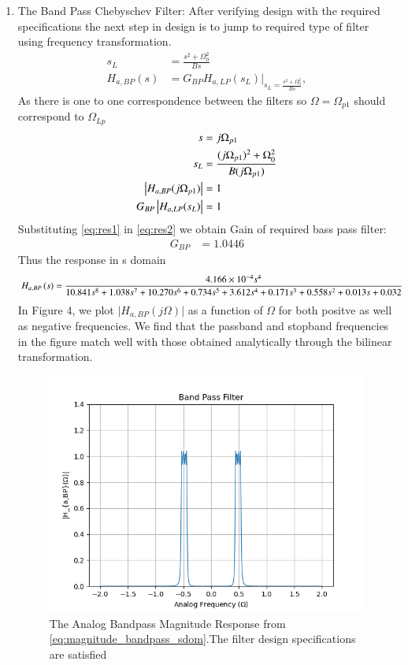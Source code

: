 \documentclass{article}
\begin{document}
\begin{enumerate}
\item {The Band Pass Chebyschev Filter:} 
After verifying design with the required specifications the next step in design is to jump to required type of filter using frequency transformation. 
\begin{align}
    s_L &= \frac{s^2 + \Omega_0^2}{Bs} \\
    H_{a,BP}(s) &= G_{BP}H_{a,LP}(s_L)\vert_{s_L = \frac{s^2 + \Omega_0^2}{Bs}},
\end{align}
As there is one to one correspondence between the filters so $\Omega=\Omega_{p1}$ should correspond to $\Omega_{Lp}$
\begin{align}
    s &= j\Omega_{p1}\\
    s_{L} &= \frac{(j\Omega_{p1})^2 + \Omega_0^2}{B(j\Omega_{p1})} \label{eq:res1} \\ 
    \left\vert H_{a,BP}(j\Omega_{p1})\right\vert &= 1 \\
    G_{BP}\left\vert H_{a,LP}(s_L)\right\vert &= 1 \label{eq:res2}
\end{align}
Substituting \eqref{eq:res1} in \eqref{eq:res2} we obtain Gain of required bass pass filter:
\begin{align}
    G_{BP} &= 1.0446 
\end{align}
Thus the response in s domain 
\begin{align}
    H_{a,BP}\left(s\right) &= \frac{4.166\times 10^{-4}s^4}{10.841s^8 + 1.038s^7 + 10.270s^6 + 0.734s^5 + 3.612s^4 + 0.171s^3 + 0.558s^2 + 0.013s + 0.032} \label{eq:magnitude_bandpass_sdom}
\end{align}
In Figure 4, we plot $\vert H_{a,BP}(j\Omega)\vert$ as a function of $\Omega$ for both positve as
well as negative frequencies.  We find that the passband and stopband frequencies in the figure
match well with those obtained analytically through the bilinear transformation.
\begin{figure}[H]
\centering
\includegraphics[width=1\columnwidth]{figs/Band_Pass_Filter.png}
\caption{The Analog Bandpass Magnitude Response from \eqref{eq:magnitude_bandpass_sdom}.The filter design specifications are satisfied}
\label{fig:band_pass_filter}
\end{figure}
\end{enumerate}
\end{document}

